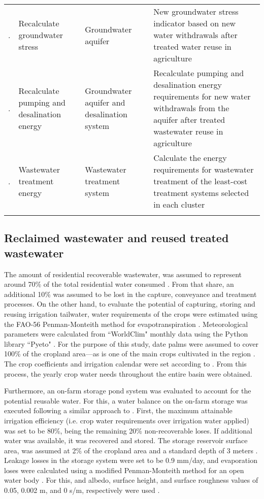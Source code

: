 \begin{table*}[!ht]
{\begin{tabular}{@{}l P{1.1in} P{1.2in} P{3.12in}}
	    . & Recalculate groundwater stress & Groundwater aquifer & New groundwater stress indicator based on new water withdrawals after treated water reuse in agriculture \\
	    . & Recalculate pumping and desalination energy & Groundwater aquifer and desalination system & Recalculate pumping and desalination energy requirements for new water withdrawals from the aquifer after treated wastewater reuse in agriculture\\
	    . & Wastewater treatment energy & Wastewater treatment system & Calculate the energy requirements for wastewater treatment of the least-cost treatment systems selected in each cluster\\
		\br
	\end{tabular}
	}
\end{table*}

\subsection{Reclaimed wastewater and reused treated wastewater}
The amount of residential recoverable wastewater, was assumed to represent around 70\% of the total residential water consumed \cite{unescoWastewaterUntappedResource2017}. From that share, an additional 10\% was assumed to be lost in the capture, conveyance and treatment processes.
On the other hand, to evaluate the potential of capturing, storing and reusing irrigation tailwater, water requirements of the crops were estimated using the FAO-56 Penman-Monteith method for evapotranspiration \cite{allenFAOIrrigationDrainage1998}. Meteorological parameters were calculated from ``WorldClim" monthly data \cite{WorldClimGlobalClimate}  using the Python library ``Pyeto" \cite{pyeto}. For the purpose of this study, date palms were assumed to cover 100\% of the cropland area---as is one of the main crops cultivated in the region \cite{almullaNWSAS}. The crop coefficients and irrigation calendar were set according to \citet{almullaNWSAS}. From this process, the yearly crop water needs throughout the entire basin were obtained.

Furthermore, an on-farm storage pond system was evaluated to account for the potential reusable water. For this, a water balance on the on-farm storage was executed following a similar approach to \citet{reinhartSimulatedWaterQuality2019}. First, the maximum attainable irrigation efficiency (i.e. crop water requirements over irrigation water applied) was set to be 80\%, being the remaining 20\% non-recoverable loses. If additional water was available, it was recovered and stored. The storage reservoir surface area, was assumed at 2\% of the cropland area and a standard depth of 3 meters \cite{reinhartSimulatedWaterQuality2019}. Leakage losses in the storage system were set to be 0.9 mm/day, and evaporation loses were calculated using a modified Penman-Monteith method for an open water body \cite{reinhartSimulatedWaterQuality2019}. For this, and albedo, surface height, and surface roughness values of 0.05, 0.002 m, and 0 s/m, respectively were used \cite{princeczarneckijobym.QuantifyingCaptureUse2017}.


